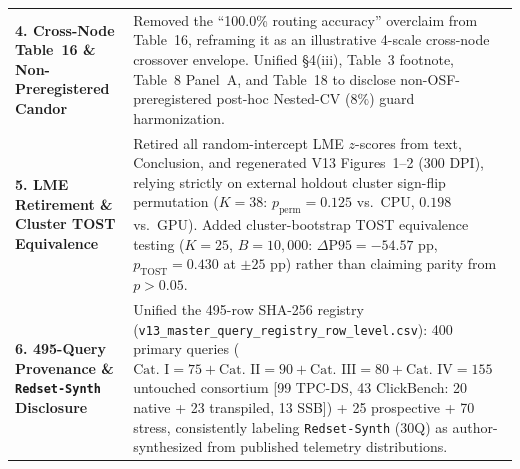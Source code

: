 \documentclass[10pt,a4paper]{article}
\begin{document}
\begin{table}[!htbp]
\begin{tabular}{@{}p{}p{}@{}}
\textbf{4. Cross-Node Table~16 \& Non-Preregistered Candor} & Removed the ``100.0\% routing accuracy'' overclaim from Table~16, reframing it as an illustrative 4-scale cross-node crossover envelope. Unified §4(iii), Table~3 footnote, Table~8 Panel~A, and Table~18 to disclose non-OSF-preregistered post-hoc Nested-CV ($8\%$) guard harmonization. \\
\textbf{5. LME Retirement \& Cluster TOST Equivalence} & Retired all random-intercept LME $z$-scores from text, Conclusion, and regenerated V13 Figures~1--2 (300 DPI), relying strictly on external holdout cluster sign-flip permutation ($K=38$: $p_{\text{perm}}=0.125$ vs.\ CPU, $0.198$ vs.\ GPU). Added cluster-bootstrap TOST equivalence testing ($K=25$, $B=10{,}000$: $\Delta\text{P95}=-54.57\text{ pp}$, $p_{\text{TOST}}=0.430$ at $\pm 25\text{ pp}$) rather than claiming parity from $p>0.05$. \\
\textbf{6. 495-Query Provenance \& \texttt{Redset-Synth} Disclosure} & Unified the 495-row SHA-256 registry (\texttt{v13\_master\_query\_registry\_row\_level.csv}): 400 primary queries ($\text{Cat.\ I}=75 + \text{Cat.\ II}=90 + \text{Cat.\ III}=80 + \text{Cat.\ IV}=155$ untouched consortium [99 TPC-DS, 43 ClickBench: 20 native + 23 transpiled, 13 SSB]) + 25 prospective + 70 stress, consistently labeling \texttt{Redset-Synth} (30Q) as author-synthesized from published telemetry distributions. \\
\bottomrule
\end{tabular}
\end{table}
\end{document}
